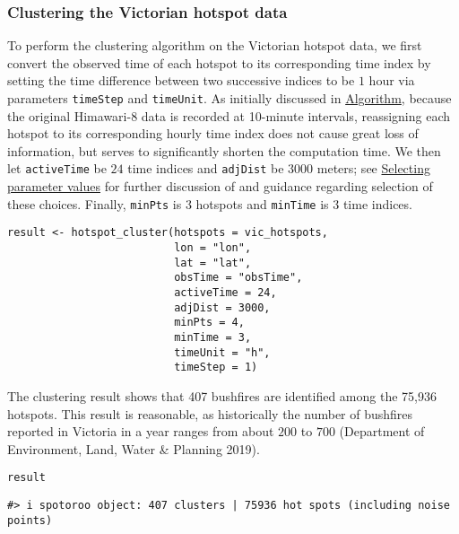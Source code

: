\hypertarget{clustering-the-victorian-hotspot-data}{%
\subsubsection{Clustering the Victorian hotspot data}\label{clustering-the-victorian-hotspot-data}}

To perform the clustering algorithm on the Victorian hotspot data, we first convert the observed time of each hotspot to its corresponding time index by setting the time difference between two successive indices to be \(1\) hour via parameters \texttt{timeStep} and \texttt{timeUnit}. As initially discussed in \protect\hyperlink{algorithm}{Algorithm}, because the original Himawari-8 data is recorded at 10-minute intervals, reassigning each hotspot to its corresponding hourly time index does not cause great loss of information, but serves to significantly shorten the computation time. We then let \texttt{activeTime} be \(24\) time indices and \texttt{adjDist} be \(3000\) meters; see \protect\hyperlink{selecting-parameter-values}{Selecting parameter values} for further discussion of and guidance regarding selection of these choices. Finally, \texttt{minPts} is \(3\) hotspots and \texttt{minTime} is \(3\) time indices.

\begin{verbatim}
result <- hotspot_cluster(hotspots = vic_hotspots,
                          lon = "lon",
                          lat = "lat",
                          obsTime = "obsTime",
                          activeTime = 24,
                          adjDist = 3000,
                          minPts = 4,
                          minTime = 3,
                          timeUnit = "h",
                          timeStep = 1)
\end{verbatim}

The clustering result shows that 407 bushfires are identified among the 75,936 hotspots. This result is reasonable, as historically the number of bushfires reported in Victoria in a year ranges from about \(200\) to \(700\) (Department of Environment, Land, Water \& Planning 2019).

\begin{verbatim}
result
\end{verbatim}

\begin{verbatim}
#> i spotoroo object: 407 clusters | 75936 hot spots (including noise points)
\end{verbatim}


